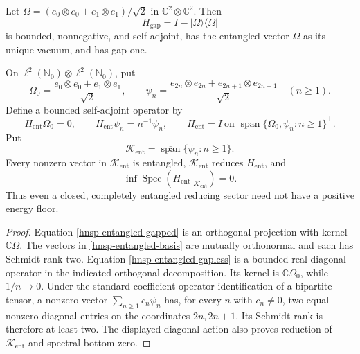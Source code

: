 \begin{proposition}
\label{hnsp-entanglement-countermodels}
Let
\(\Omega=(e_0\otimes e_0+e_1\otimes e_1)/\sqrt2\) in
\(\mathbb C^2\otimes\mathbb C^2\).  Then
\begin{equation}
 H_{\mathrm{gap}}=I-|\Omega\rangle\langle\Omega|
 \label{hnsp-entangled-gapped}
\end{equation}
is bounded, nonnegative, and self-adjoint, has the entangled vector
\(\Omega\) as its unique vacuum, and has gap one.

On \(\ell^2(\mathbb N_0)\otimes\ell^2(\mathbb N_0)\), put
\begin{equation}
 \Omega_0=\frac{e_0\otimes e_0+e_1\otimes e_1}{\sqrt2},\qquad
 \psi_n=\frac{e_{2n}\otimes e_{2n}+e_{2n+1}\otimes e_{2n+1}}{\sqrt2}
 \quad(n\geq1).
 \label{hnsp-entangled-basis}
\end{equation}
Define a bounded self-adjoint operator by
\begin{equation}
 H_{\mathrm{ent}}\Omega_0=0,\qquad
 H_{\mathrm{ent}}\psi_n=n^{-1}\psi_n,
 \qquad H_{\mathrm{ent}}=I\ \text{on }
 \overline{\operatorname{span}}\{\Omega_0,\psi_n:n\geq1\}^\perp.
 \label{hnsp-entangled-gapless}
\end{equation}
Put
\[
 \mathcal K_{\mathrm{ent}}
 =\overline{\operatorname{span}}\{\psi_n:n\geq1\}.
\]
Every nonzero vector in \(\mathcal K_{\mathrm{ent}}\) is entangled,
\(\mathcal K_{\mathrm{ent}}\) reduces \(H_{\mathrm{ent}}\), and
\[
 \inf\operatorname{Spec}
  (H_{\mathrm{ent}}|_{\mathcal K_{\mathrm{ent}}})=0.
\]
Thus even a closed, completely entangled reducing sector need not have a
positive energy floor.
\end{proposition}

\begin{proof}
Equation \eqref{hnsp-entangled-gapped} is an orthogonal projection with
kernel \(\mathbb C\Omega\).  The vectors in
\eqref{hnsp-entangled-basis} are mutually orthonormal and each has Schmidt
rank two.  Equation \eqref{hnsp-entangled-gapless} is a bounded real diagonal
operator in the indicated orthogonal decomposition.  Its kernel is
\(\mathbb C\Omega_0\), while \(1/n\to0\).  Under the standard
coefficient-operator identification of a bipartite tensor, a nonzero vector
\(\sum_{n\geq1}c_n\psi_n\) has, for every \(n\) with \(c_n\ne0\), two equal
nonzero diagonal entries on the coordinates \(2n,2n+1\).  Its Schmidt rank is
therefore at least two.  The displayed diagonal action also proves reduction
of \(\mathcal K_{\mathrm{ent}}\) and spectral bottom zero.
\end{proof}

